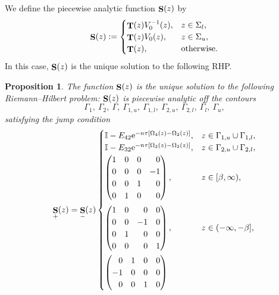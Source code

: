 \documentclass[pdftex]{sigma}
\DeclareMathOperator{\TT}{{\bf T}}
\DeclareMathOperator{\boldS}{{\bf S}}
\numberwithin{equation}{section}
\newtheorem{Proposition}[Theorem]{Proposition}
 { \theoremstyle{definition}
\newtheorem{Definition}[Theorem]{Definition}
\newtheorem{Note}[Theorem]{Note}
\newtheorem{Example}[Theorem]{Example}
\newtheorem{Remark}[Theorem]{Remark} }
\begin{document}
We define the piecewise analytic function $\boldS(z)$ by
 \begin{equation*}
 \boldS(z) :=
 \begin{cases}
 \TT(z)V_0^{-1}(z), & z\in\Sigma_{l},\\
 \TT(z)V_0(z), & z\in\Sigma_{u},\\
 \TT(z), & \text{otherwise}.
 \end{cases}
 \end{equation*}
In this case, $\boldS(z)$ is the unique solution to the following RHP.

 \begin{Proposition} %
 The function $\boldS(z)$ is the unique solution to the following Riemann--Hilbert problem:
 $\boldS(z)$ is piecewise analytic off the contours
 \[
 \Gamma_1 , \ \Gamma_2, \ \Gamma, \ \Gamma_{1,u}, \ \Gamma_{1,l}, \ \Gamma_{2,u}, \ \Gamma_{2,l}, \ \Gamma_l, \ \Gamma_u,
 \]
 satisfying the jump condition
 \begin{equation*} %
 \boldS_{+}(z) = \boldS_{-}(z)
 \begin{cases}
 \mathbb{I} - E_{42}{\rm e}^{-n\tau[\Omega_4(z) - \Omega_2(z)]}, & z\in \Gamma_{1,u} \cup \Gamma_{1,l},\\
 \mathbb{I} - E_{32}{\rm e}^{-n\tau[\Omega_3(z) - \Omega_2(z)]}, & z\in \Gamma_{2,u} \cup \Gamma_{2,l},\\
 \begin{pmatrix}
 1 & 0 & 0 & \hphantom{-}0\\
 0 & 0 & 0 & -1\\
 0 & 0 & 1 & \hphantom{-}0\\
 0 & 1 & 0 & \hphantom{-}0
 \end{pmatrix}, & z\in [\beta,\infty),\vspace{1mm}\\
 \begin{pmatrix}
 1 & 0 & \hphantom{-}0 & 0\\
 0 & 0 & -1 & 0\\
 0 & 1 & \hphantom{-}0 & 0\\
 0 & 0 & \hphantom{-}0 & 1
 \end{pmatrix}, & z\in (-\infty,-\beta],\vspace{1mm}\\
 \begin{pmatrix}
 \hphantom{-}0 & 1 & 0 & 0\\
 -1 & 0 & 0 & 0\\
 \hphantom{-}0 & 0 & 1 & 0 \\

\end{pmatrix}
\end{cases}
\end{equation*}
\end{Proposition}
\end{document}
